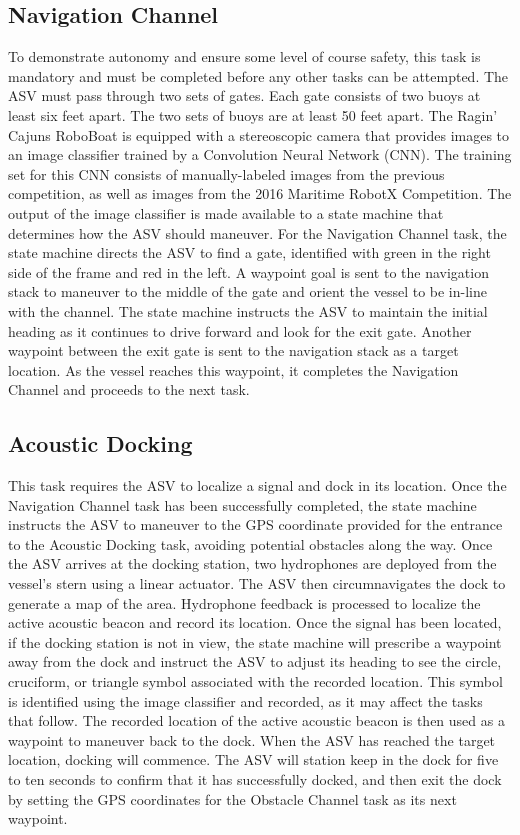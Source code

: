 \documentclass[letterpaper, 10 pt, conference]{ieeeconf}
\begin{document}
\subsection{Navigation Channel}
\label{NavigationChannel}
To demonstrate autonomy and ensure some level of course safety, this task is mandatory and must be completed before any other tasks can be attempted. The ASV must pass through two sets of gates. Each gate consists of two buoys at least six feet apart. The two sets of buoys are at least 50 feet apart. The Ragin' Cajuns RoboBoat is equipped with a stereoscopic camera that provides images to an image classifier trained by a Convolution Neural Network (CNN). The training set for this CNN consists of manually-labeled images from the previous competition, as well as images from the 2016 Maritime RobotX Competition. The output of the image classifier is made available to a state machine that determines how the ASV should maneuver. For the Navigation Channel task, the state machine directs the ASV to find a gate, identified with green in the right side of the frame and red in the left. A waypoint goal is sent to the navigation stack to maneuver to the middle of the gate and orient the vessel to be in-line with the channel. The state machine instructs the ASV to maintain the initial heading as it continues to drive forward and look for the exit gate. Another waypoint between the exit gate is sent to the navigation stack as a target location. As the vessel reaches this waypoint, it completes the Navigation Channel and proceeds to the next task.

\subsection{Acoustic Docking}
This task requires the ASV to localize a signal and dock in its location. Once the Navigation Channel task has been successfully completed, the state machine instructs the ASV to maneuver to the GPS coordinate provided for the entrance to the Acoustic Docking task, avoiding potential obstacles along the way. Once the ASV arrives at the docking station, two hydrophones are deployed from the vessel's stern using a linear actuator. The ASV then circumnavigates the dock to generate a map of the area.  Hydrophone feedback is processed to localize the active acoustic beacon and record its location. Once the signal has been located, if the docking station is not in view, the state machine will prescribe a waypoint away from the dock and instruct the ASV to adjust its heading to see the circle, cruciform, or triangle symbol associated with the recorded location. This symbol is identified using the image classifier and recorded, as it may affect the tasks that follow. The recorded location of the active acoustic beacon is then used as a waypoint to maneuver back to the dock. When the ASV has reached the target location, docking will commence. The ASV will station keep in the dock for five to ten seconds to confirm that it has successfully docked, and then exit the dock by setting the GPS coordinates for the Obstacle Channel task as its next waypoint.
\end{document}
